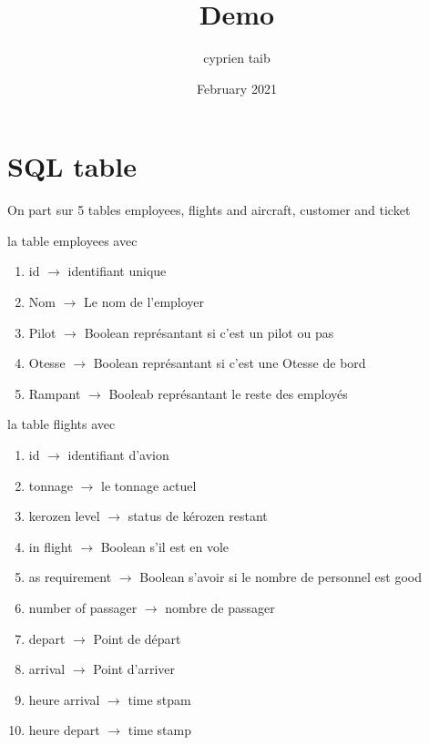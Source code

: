 \documentclass{article}
\title{Demo}
\author{cyprien taib}
\date{February 2021}
\begin{document}
    \maketitle

    \section{SQL table}
        On part sur 5 tables 
            employees, flights and aircraft, customer and ticket

        la table employees avec 
        
            \begin{enumerate}
                \centering
                \item id $\rightarrow$ identifiant unique 
                \item Nom $\rightarrow$ Le nom de l'employer
                \item Pilot $\rightarrow$ Boolean représantant si c'est un pilot ou pas
                \item Otesse $\rightarrow$ Boolean représantant si c'est une Otesse de bord
                \item Rampant $\rightarrow$ Booleab représantant le reste des employés
            \end{enumerate}
            
        
        la table flights avec 
            \begin{enumerate}
                \centering
                \item id $\rightarrow$ identifiant d'avion
                \item tonnage $\rightarrow$ le tonnage actuel 
                \item kerozen level $\rightarrow$ status de kérozen restant 
                \item in flight $\rightarrow$ Boolean s'il est en vole
                \item as requirement $\rightarrow$ Boolean s'avoir si le nombre de personnel est good
                \item number of passager $\rightarrow$ nombre de passager 
                \item depart $\rightarrow$ Point de départ
                \item arrival $\rightarrow$ Point d'arriver
                \item heure arrival $\rightarrow$ time stpam 
                \item heure depart $\rightarrow$ time  stamp
            \end{enumerate}
\end{document}
